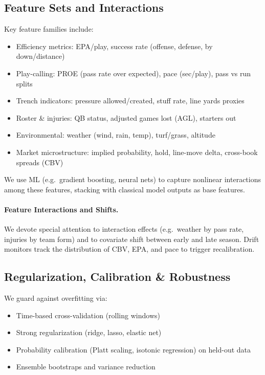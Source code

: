 \subsection{Feature Sets and Interactions}
Key feature families include:
\begin{itemize}
  \item Efficiency metrics: EPA/play, success rate (offense, defense, by down/distance)
  \item Play-calling: PROE (pass rate over expected), pace (sec/play), pass vs run splits
  \item Trench indicators: pressure allowed/created, stuff rate, line yards proxies
  \item Roster \& injuries: QB status, adjusted games lost (AGL), starters out
  \item Environmental: weather (wind, rain, temp), turf/grass, altitude
  \item Market microstructure: implied probability, hold, line-move delta, cross-book spreads (CBV)
\end{itemize}

We use ML (e.g.\ gradient boosting, neural nets) to capture nonlinear interactions among these features, stacking with classical model outputs as base features.

\paragraph{Feature Interactions and Shifts.}
We devote special attention to interaction effects (e.g.\ weather by pass rate, injuries by team form) and to covariate shift between early and late season. Drift monitors track the distribution of CBV, EPA, and pace to trigger recalibration.

\subsection{Regularization, Calibration \& Robustness}
We guard against overfitting via:
\begin{itemize}
  \item Time-based cross-validation (rolling windows)
  \item Strong regularization (ridge, lasso, elastic net)
  \item Probability calibration (Platt scaling, isotonic regression) on held-out data
  \item Ensemble bootstraps and variance reduction
\end{itemize}

